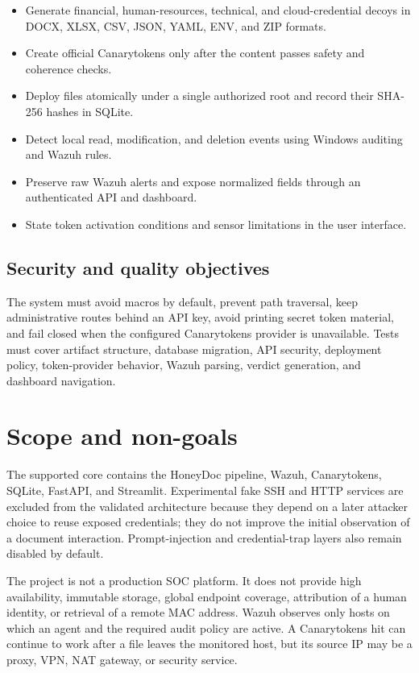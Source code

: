 \begin{itemize}
  \item Generate financial, human-resources, technical, and cloud-credential
  decoys in DOCX, XLSX, CSV, JSON, YAML, ENV, and ZIP formats.
  \item Create official Canarytokens only after the content passes safety and
  coherence checks.
  \item Deploy files atomically under a single authorized root and record their
  SHA-256 hashes in SQLite.
  \item Detect local read, modification, and deletion events using Windows
  auditing and Wazuh rules.
  \item Preserve raw Wazuh alerts and expose normalized fields through an
  authenticated API and dashboard.
  \item State token activation conditions and sensor limitations in the user
  interface.
\end{itemize}

\subsection{Security and quality objectives}

The system must avoid macros by default, prevent path traversal, keep
administrative routes behind an API key, avoid printing secret token material,
and fail closed when the configured Canarytokens provider is unavailable.
Tests must cover artifact structure, database migration, API security,
deployment policy, token-provider behavior, Wazuh parsing, verdict generation,
and dashboard navigation.

\section{Scope and non-goals}

The supported core contains the HoneyDoc pipeline, Wazuh, Canarytokens, SQLite,
FastAPI, and Streamlit. Experimental fake SSH and HTTP services are excluded
from the validated architecture because they depend on a later attacker choice
to reuse exposed credentials; they do not improve the initial observation of a
document interaction. Prompt-injection and credential-trap layers also remain
disabled by default.

The project is not a production SOC platform. It does not provide high
availability, immutable storage, global endpoint coverage, attribution of a
human identity, or retrieval of a remote MAC address. Wazuh observes only hosts
on which an agent and the required audit policy are active. A Canarytokens hit
can continue to work after a file leaves the monitored host, but its source IP
may be a proxy, VPN, NAT gateway, or security service.

